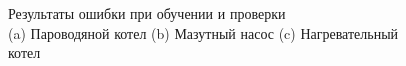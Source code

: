 \begin{figure}[H]
  \centering
  \caption{Результаты ошибки при обучении и проверки\\(a) Пароводяной котел (b)
  Мазутный насос (c) Нагревательный котел}\label{fig:test:plot:learning}
\end{figure}


